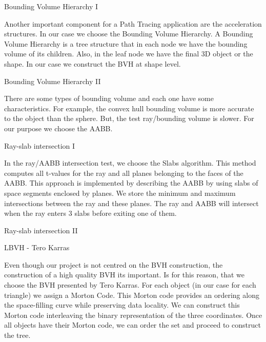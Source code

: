 \documentclass{beamer}
\begin{document}
\begin{frame}{Bounding Volume Hierarchy I}

Another important component for a Path Tracing application are the acceleration structures. In our case we choose the Bounding Volume Hierarchy. A Bounding Volume Hierarchy is a tree structure that in each node we have the bounding volume of its children. Also, in the leaf node we have the final 3D object or the shape. In our case we construct the BVH at shape level.

\end{frame}

\begin{frame}{Bounding Volume Hierarchy II}

There are some types of bounding volume and each one have some characteristics. For example, the convex hull bounding volume is more accurate to the object than the sphere. But, the test ray/bounding volume is slower. For our purpose we choose the AABB.

\end{frame}

\begin{frame}{Ray-slab intersection I}

In the ray/AABB intersection test, we choose the Slabs algorithm. This method computes all t-values for the ray and all planes belonging to the faces of the AABB. This approach is implemented by describing the AABB by using slabs of space segments enclosed by planes. We store the minimum and maximum intersections between the ray and these planes. The ray and AABB will intersect when the ray enters 3 slabs before exiting one of them.

\end{frame}

\begin{frame}{Ray-slab intersection II}


\end{frame}

\begin{frame}{LBVH - Tero Karras}

Even though our project is not centred on the BVH construction, the construction of a high quality BVH its important. Is for this reason, that we choose the BVH presented by Tero Karras. For each object (in our case for each triangle) we assign a Morton Code. This Morton code provides an ordering along the space-filling curve while preserving data locality. We can construct this Morton code interleaving the binary representation of the three coordinates. Once all objects have their Morton code, we can order the set and proceed to construct the tree.

\end{frame}
\end{document}
